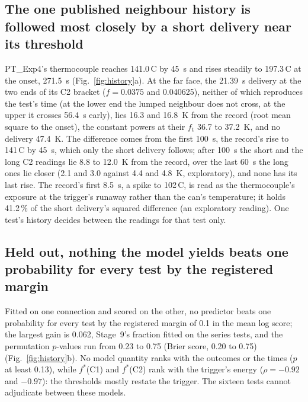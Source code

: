 \documentclass[preprint,12pt]{elsarticle}
\newcommand{\degC}{\,\textdegree C}
\newcommand{\fs}{f^{*}}
\newcommand{\ft}{f_{\mathrm{t}}}
\begin{document}
\subsection{The one published neighbour history is followed most closely by a short delivery near its threshold}
\label{sec:res-history}

PT\_Exp4's thermocouple reaches 141.0\degC{} by 45~s and rises steadily to 197.3\degC{} at the onset, 271.5~s (Fig.~\ref{fig:history}a). At the far face, the 21.39~s delivery at the two ends of its C2 bracket ($f=0.0375$ and 0.040625), neither of which reproduces the test's time (at the lower end the lumped neighbour does not cross, at the upper it crosses 56.4~s early), lies 16.3 and 16.8~K from the record (root mean square to the onset), the constant powers at their $\ft$ 36.7 to 37.2~K, and no delivery 47.4~K. The difference comes from the first 100~s, the record's rise to 141\degC{} by 45~s, which only the short delivery follows; after 100~s the short and the long C2 readings lie 8.8 to 12.0~K from the record, over the last 60~s the long ones lie closer (2.1 and 3.0 against 4.4 and 4.8~K, exploratory), and none has its last rise. The record's first 8.5~s, a spike to 102\degC, is read as the thermocouple's exposure at the trigger's runaway rather than the can's temperature; it holds 41.2\,\% of the short delivery's squared difference (an exploratory reading). One test's history decides between the readings for that test only.

\subsection{Held out, nothing the model yields beats one probability for every test by the registered margin}
\label{sec:res-heldout}

Fitted on one connection and scored on the other, no predictor beats one probability for every test by the registered margin of 0.1 in the mean log score; the largest gain is 0.062, Stage~9's fraction fitted on the series tests, and the permutation $p$-values run from 0.23 to 0.75 (Brier score, 0.20 to 0.75) (Fig.~\ref{fig:history}b). No model quantity ranks with the outcomes or the times ($p$ at least 0.13), while $\fs$(C1) and $\fs$(C2) rank with the trigger's energy ($\rho=-0.92$ and $-0.97$): the thresholds mostly restate the trigger. The sixteen tests cannot adjudicate between these models.
\end{document}
